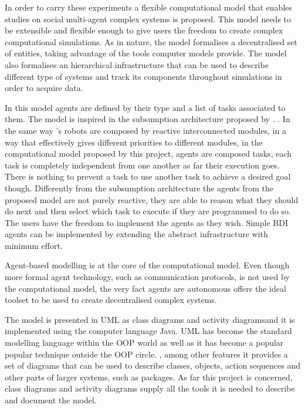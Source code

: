 In order to carry these experiments a flexible computational model that enables studies on social multi-agent complex systems is proposed. This model needs to be extensible and flexible enough to give users the freedom to create complex computational simulations. As in nature, the model formalises a decentralised set of entities, taking advantage of the tools computer models provide. The model also formalises an hierarchical infrastructure that can be used to describe different type of systems and track its components throughout simulations in order to acquire data.
 
In this model agents are defined by their type and a list of tasks associated to them. The model is inspired in the subsumption architecture proposed by \citeauthor{1087032}. \cite{1087032} \cite{Brooks1986b}. In the same way \citeauthor{1087032}'s robots are composed by reactive interconnected modules, in a way that effectively gives different priorities to different modules, in the computational model proposed by this project, agents are composed tasks, each task is completely independent from one another as far their execution goes. There is nothing to prevent a task to use another task to achieve a desired goal though. Differently from the subsumption architecture the agents from the proposed model are not purely reactive, they are able to reason what they should do next and then select which task to execute if they are programmed to do so. The users have the freedom to implement the agents as they wish. Simple BDI \cite{bratman1999intention} \cite{wooldridge2009introduction} agents can be implemented by extending the abstract infrastructure with minimum effort.

Agent-based modelling is at the core of the computational model. Even though more formal agent technology, such as communication protocols, is not used by the computational model, the very fact agents are autonomous offers the ideal toolset to be used to create decentralised complex systems.

The model is presented in UML as class diagrams and activity diagramsand it is implemented using the computer language Java. UML has become the standard modelling language within the OOP world as well as it has become a popular popular technique outside the OOP circle. \cite{fowler2004uml}, among other features it provides a set of diagrams that can be used to describe classes, objects, action sequences and other parts of larger systems, such as packages. As far this project is concerned, class diagrams and activity diagrams supply all the tools it is needed to describe and document the model.

